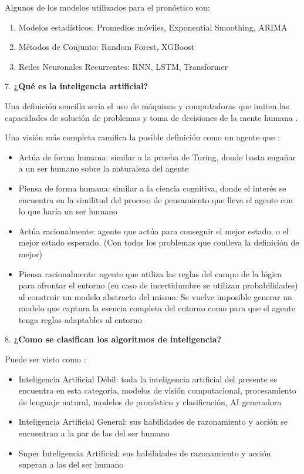 \documentclass{article}
\begin{document}
    Algunos de los modelos utilizados para el pronóstico son:
    \begin{enumerate}
        \item Modelos estadísticos: Promedios móviles, Exponential Smoothing, ARIMA
        \item Métodos de Conjunto: Random Forest, XGBoost
        \item Redes Neuronales Recurrentes: RNN, LSTM, Transformer
    \end{enumerate}

    7. \textbf{¿Qué es la inteligencia artificial?}

    Una definición sencilla sería el uso de máquinas y computadoras que imiten las capacidades de solución de problemas y toma de decisiones de la mente humana \cite{ibm-ai}.

    Una visión más completa ramifica la posible definición como un agente que \cite{russell2021artificial}:
    \begin{itemize}
        \item Actúa de forma humana: similar a la prueba de Turing, donde basta engañar a un ser humano sobre la naturaleza del agente
        \item Piensa de forma humana: similar a la ciencia cognitiva, donde el interés se encuentra en la similitud del proceso de pensamiento que lleva el agente con lo que haría un ser humano
        \item Actúa racionalmente: agente que actúa para conseguir el mejor estado, o el mejor estado esperado. (Con todos los problemas que conlleva la definición de mejor)
        \item Piensa racionalmente: agente que utiliza las reglas del campo de la lógica para afrontar el entorno (en caso de incertidumbre se utilizan probabilidades) al construir un modelo abstracto del mismo. Se vuelve imposible generar un modelo que captura la esencia completa del entorno como para que el agente tenga reglas adaptables al entorno
    \end{itemize}

    8. \textbf{¿Como se clasifican los algoritmos de inteligencia?}

        Puede ser visto como \cite{team-2023}:
        \begin{itemize}
            \item Inteligencia Artificial Débil: toda la inteligencia artificial del presente se encuentra en esta categoría, modelos de visión computacional, procesamiento de lenguaje natural, modelos de pronóstico y clasificación, AI generadora
            \item Inteligencia Artificial General: sus habilidades de razonamiento y acción se encuentran a la par de las del ser humano
            \item Super Inteligencia Artificial: sus habilidades de razonamiento y acción superan a las del ser humano
        \end{itemize}
\end{document}
